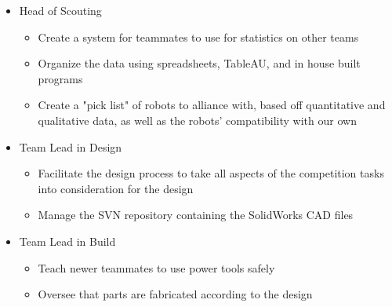 \documentclass[]{friggeri-cv} %
\begin{document}
\begin{entrylist}
{\begin{itemize}
\begin{itemize}
\end{itemize}
\item Head of Scouting 
\begin{itemize}
\item Create a system for teammates to use for statistics on other teams 
\item Organize the data using spreadsheets, TableAU, and in house built programs 
\item Create a "pick list" of robots to alliance with, based off quantitative and qualitative data, as well as the robots' compatibility with our own 
\end{itemize}
\item Team Lead in Design 
\begin{itemize}
\item Facilitate the design process to take all aspects of the competition tasks into consideration for the design 
\item Manage the SVN repository containing the SolidWorks CAD files 
\end{itemize}
\item Team Lead in Build 
\begin{itemize}
\item Teach newer teammates to use power tools safely 
\item Oversee that parts are fabricated according to the design 
\end{itemize}
\end{itemize}
}



\end{entrylist}
\end{document}
